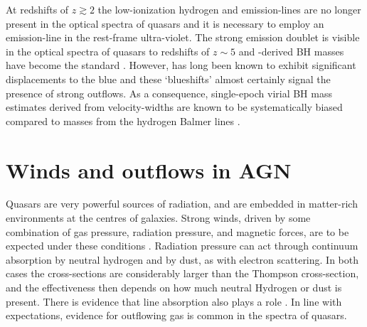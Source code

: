 At redshifts of $z\gtrsim 2$ the low-ionization hydrogen and  emission-lines are no longer present in the optical spectra of quasars and it is necessary to employ an emission-line in the rest-frame ultra-violet.
The strong  emission doublet is visible in the optical spectra of quasars to redshifts of $z\sim5$ and -derived BH masses have become the standard \citep[e.g.][]{vestergaard06,park13}.
However,  has long been known to exhibit significant displacements to the blue and these `blueshifts' almost certainly signal the presence of strong outflows.
As a consequence, single-epoch virial BH mass estimates derived from  velocity-widths are known to be systematically biased compared to masses from the hydrogen Balmer lines \citep[e.g.][]{baskin05,trakhtenbrot12,shen12}.

\section{Winds and outflows in AGN}
\label{sec:ch1-winds}

Quasars are very powerful sources of radiation, and are embedded in matter-rich environments at the centres of galaxies.
Strong winds, driven by some combination of gas pressure, radiation pressure, and magnetic forces, are to be expected under these conditions \citep[e.g.][]{blandford82b,proga00,everett05}.
Radiation pressure can act through continuum absorption by neutral hydrogen and by dust, as with electron scattering.
In both cases the cross-sections are considerably larger than the Thompson cross-section, and the effectiveness then depends on how much neutral Hydrogen or dust is present.
There is evidence that line absorption also plays a role \citep[e.g.][]{bowler14}.
In line with expectations, evidence for outflowing gas is common in the spectra of quasars.

